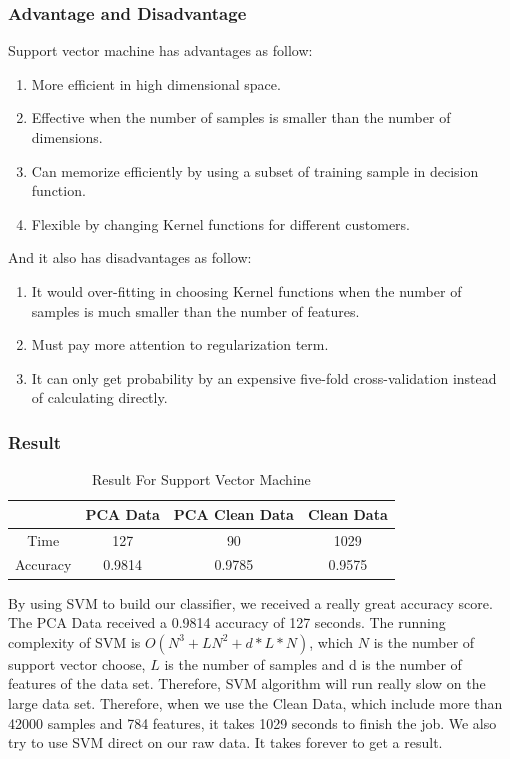 \documentclass[sigconf]{acmart}
\begin{document}
\subsubsection{Advantage and Disadvantage}

Support vector machine has advantages as follow:
\begin{enumerate}
    \item More efficient in high dimensional space.
    \item Effective when the number of samples is smaller than the number of dimensions.
    \item Can memorize efficiently by using a subset of training sample in decision function.
    \item Flexible by changing Kernel functions for different customers.
\end{enumerate}

And it also has disadvantages as follow:
\begin{enumerate}
    \item It would over-fitting in choosing Kernel functions when the number of samples is much smaller than the number of features.
    \item Must pay more attention to regularization term.
    \item It can only get probability by an expensive five-fold cross-validation instead of calculating directly.
\end{enumerate}

\subsubsection{Result}

\begin{table}[htb]
    \centering
    \begin{tabular}{|c|c|c|c|} \hline
                 &  PCA Data & PCA Clean Data & Clean Data \\ \hline
        Time     &  127      & 90              & 1029      \\
        Accuracy &  0.9814   & 0.9785          & 0.9575    \\ \hline
    \end{tabular}
    \caption{Result For Support Vector Machine}
\end{table}

By using SVM to build our classifier, we received a really great accuracy score. The PCA Data received a 0.9814 accuracy of 127 seconds. 
The running complexity of SVM is $O(N^3+LN^2+d*L*N)$, which $N$ is the number of support vector choose, $L$ is the number of samples and d is the number of features of the data set. Therefore, SVM algorithm will run really slow on the large data set. Therefore, when we use the Clean Data, which include more than 42000 samples and 784 features, it takes 1029 seconds to finish the job. We also try to use SVM direct on our raw data. It takes forever to get a result.
\end{document}
